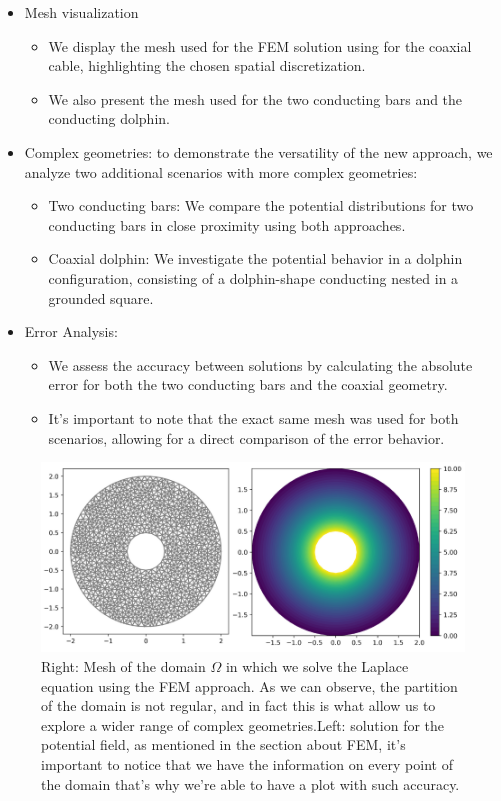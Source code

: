 \documentclass{PoS}
\begin{document}
\begin{itemize}
    \item Mesh visualization 
        \begin{itemize}
            \item We display the mesh used for the FEM solution using for the coaxial cable, highlighting the chosen spatial discretization.
            \item We also present the mesh used for the two conducting bars and the conducting dolphin.
        \end{itemize}
    \item Complex geometries: to demonstrate the versatility of the new approach, we analyze two additional scenarios with more complex geometries:
    \begin{itemize}
        \item Two conducting bars: We compare the potential distributions for two conducting bars in close proximity using both approaches.
        \item Coaxial dolphin: We investigate the potential behavior in a dolphin configuration, consisting of a dolphin-shape conducting nested in a grounded square.
    \end{itemize}
        

    \item Error Analysis:
        \begin{itemize}
            \item We assess the accuracy between solutions by calculating the absolute error for both the two conducting bars and the coaxial geometry.
            \item It's important to note that the exact same mesh was used for both scenarios, allowing for a direct comparison of the error behavior.
        \end{itemize}
\end{itemize}


\begin{figure}
\begin{center}
\includegraphics[width=.85\textwidth]{Figures/FEM/CoaxialMeshandV_FEM.png}
\caption{Right: Mesh of the domain $\Omega$ in which we solve the Laplace equation using the FEM approach. As we can observe, the partition of the domain is not regular, and in fact this is what allow us to explore a wider range of complex geometries.Left: solution for the potential field, as mentioned in the section about FEM, it's important to notice that we have the information on every point of the domain that's why we're able to have a plot with such accuracy.}
\label{fig:FEM_Mesh_and_Potential}
\end{center}
\end{figure}
\end{document}
